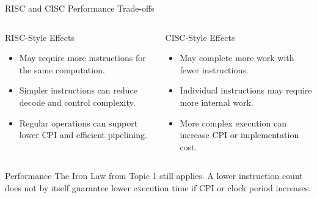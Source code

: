 \documentclass[aspectratio=169,11pt,t]{beamer}
\begin{document}

\begin{frame}{RISC and CISC Performance Trade-offs}

\begin{columns}[T,onlytextwidth]

\begin{block}{RISC-Style Effects}
\begin{itemize}\setlength{\itemsep}{4pt}
  \item May require more instructions for the same computation.
  \item Simpler instructions can reduce decode and control complexity.
  \item Regular operations can support lower CPI and efficient pipelining.
\end{itemize}
\end{block}

\begin{block}{CISC-Style Effects}
\begin{itemize}\setlength{\itemsep}{4pt}
  \item May complete more work with fewer instructions.
  \item Individual instructions may require more internal work.
  \item More complex execution can increase CPI or implementation cost.
\end{itemize}
\end{block}

\end{columns}

\vspace{0.2cm}

\begin{block}{Performance}
The Iron Law from Topic 1 still applies. A lower instruction count does not
by itself guarantee lower execution time if CPI or clock period increases.
\end{block}

\end{frame}






\end{document}
